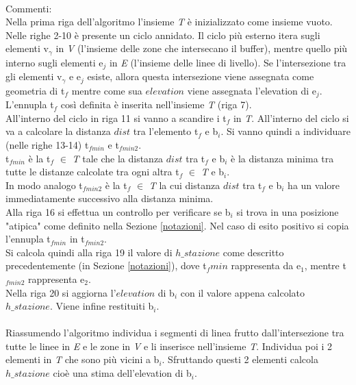 \mbox{}\\
Commenti:\\
Nella prima riga dell'algoritmo l'insieme \textit{T} è inizializzato come insieme vuoto.\\ 
Nelle righe 2-10 è presente un ciclo annidato. Il ciclo più esterno itera sugli elementi v$_\gamma$ in \textit{V} (l'insieme delle zone che intersecano il buffer), mentre quello più interno sugli elementi e$_j$ in \textit{E} (l'insieme delle linee di livello). Se l'intersezione tra gli elementi v$_\gamma$ e e$_j$ esiste, allora questa intersezione viene assegnata come geometria di t$_f$ mentre come sua $elevation$ viene assegnata l'elevation di e$_j$. L'ennupla t$_f$ così definita è inserita nell'insieme \textit{T} (riga 7). \\
All'interno del ciclo in riga 11 si vanno a scandire i t$_f$ in \textit{T}. All'interno del ciclo si va a calcolare la distanza $dist$ tra l'elemento t$_f$ e b$_i$. Si vanno quindi a individuare (nelle righe 13-14) t$_{fmin}$ e t$_{fmin2}$.\\
t$_{fmin}$ è la t$_f$ $\in$ \textit{T} tale che la distanza $dist$ tra  t$_f$ e b$_i$ è la distanza minima tra tutte le distanze calcolate tra ogni altra t$_f$ $\in$ \textit{T} e b$_i$.\\
In modo analogo t$_{fmin2}$ è la t$_f$ $\in$ \textit{T} la cui distanza $dist$ tra  t$_f$ e b$_i$ ha un valore immediatamente successivo alla distanza minima.\\
Alla riga 16 si effettua un controllo per verificare se b$_i$ si trova in una posizione "atipica" come definito nella Sezione \ref{notazioni}. Nel caso di esito positivo si copia l'ennupla t$_{fmin}$ in t$_{fmin2}$.\\
Si calcola quindi alla riga 19 il valore di $h\_stazione$ come descritto precedentemente (in Sezione \ref{notazioni}), dove t$_fmin$ rappresenta da e$_1$, mentre t$_{fmin2}$ rappresenta e$_2$.\\
Nella riga 20 si aggiorna l'$elevation$ di b$_i$ con il valore appena calcolato $h\_stazione$. Viene infine restituiti b$_i$.\\
\mbox{}\\
Riassumendo l'algoritmo individua i segmenti di linea frutto dall'intersezione tra tutte le linee in \textit{E} e le zone in \textit{V} e li inserisce nell'insieme \textit{T}. Individua poi i 2 elementi in \textit{T} che sono più vicini a b$_i$. Sfruttando questi 2 elementi calcola $h\_stazione$ cioè una stima dell'elevation di b$_i$.\\
